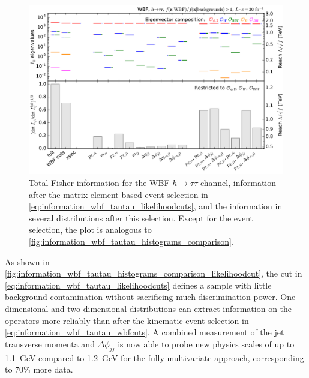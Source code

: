 \begin{figure}
  \includegraphics[width=\textwidth]{fig/information/wbf_tautau_histos_comparison_likelihoodcut}
  \caption{Total Fisher information for the WBF $h \to \tau \tau$
    channel, information after the matrix-element-based event
    selection in \autoref{eq:information_wbf_tautau_likelihoodcuts},
    and the information in several distributions after this
    selection. Except for the event selection, the plot is analogous to
    \autoref{fig:information_wbf_tautau_histograms_comparison}.}
\label{fig:information_wbf_tautau_histograms_comparison_likelihoodcut}
\end{figure}

As shown in
\autoref{fig:information_wbf_tautau_histograms_comparison_likelihoodcut},
the cut in \autoref{eq:information_wbf_tautau_likelihoodcuts} defines
a sample with little background contamination without sacrificing much
discrimination power. One-dimensional and two-dimensional
distributions can extract information on the operators more reliably
than after the kinematic event selection in
\autoref{eq:information_wbf_tautau_wbfcuts}. A combined measurement of
the jet transverse momenta and $\Delta \phi_{jj}$ is now able to probe
new physics scales of up to 1.1~GeV compared to 1.2~GeV for the fully
multivariate approach, corresponding to $70\%$ more data.




